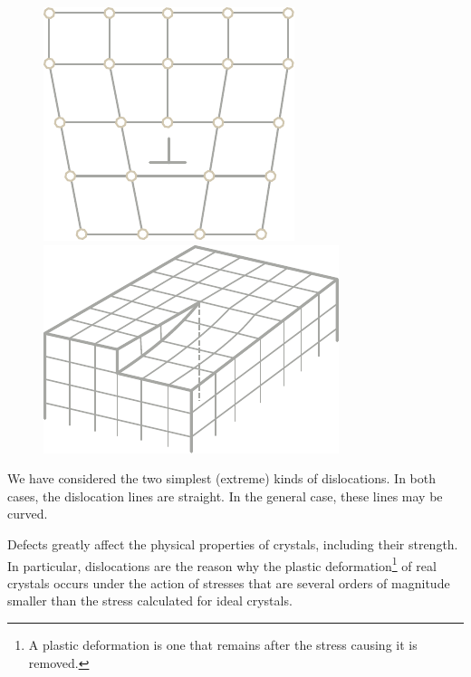\begin{figure}[t]
	\begin{minipage}[t]{0.5\linewidth}
		\begin{center}
			\includegraphics[scale=1.0]{figures/ch_13/fig_13_8.pdf}
			\caption[]{}
			\label{fig:13_8}
		\end{center}
	\end{minipage}
	\hspace{-0.05cm}
	\begin{minipage}[t]{0.5\linewidth}
		\begin{center}
			\includegraphics[scale=1.0]{figures/ch_13/fig_13_9.pdf}
			\caption[]{}
			\label{fig:13_9}
		\end{center}
	\end{minipage}
	\vspace{-0.4cm}
\end{figure}

We have considered the two simplest (extreme) kinds of dislocations. In both cases, the dislocation lines are straight. In the general case, these lines may be curved.

Defects greatly affect the physical properties of crystals, including their strength. In particular, dislocations are the reason why the plastic deformation\footnote{A plastic deformation is one that remains after the stress causing it is removed.} of real crystals occurs under the action of stresses that are several orders of magnitude smaller than the stress calculated for ideal crystals.

